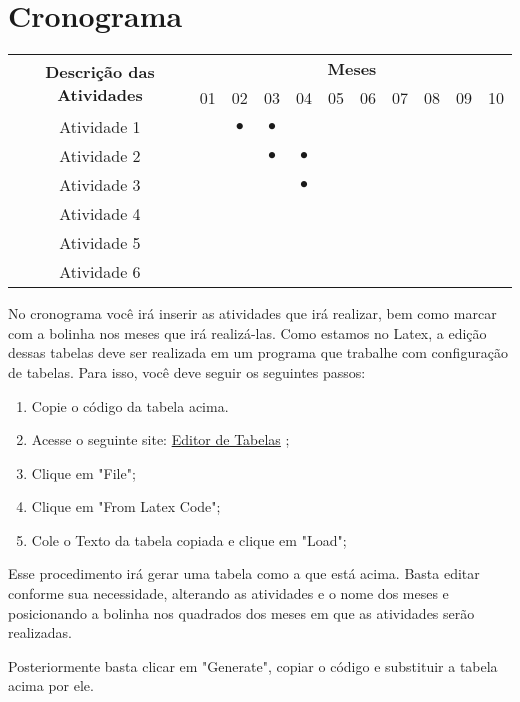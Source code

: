 \chapter{Cronograma}  \label{cap:07}


\begin{table}[!h]
\begin{tabular}{|c|c|c|c|c|c|c|c|c|c|c|}
\hline
\multirow{2}{*}{\textbf{Descrição das Atividades}} & \multicolumn{10}{c|}{\textbf{Meses}}            \\ \cline{2-11} 
                                                   & 01 & 02 & 03 & 04 & 05 & 06 & 07 & 08 & 09 & 10 \\ \hline
Atividade 1                                        &    & $\bullet$ & $\bullet$  &    &    &    &    &    &    &    \\ \hline
Atividade 2                                        &    &    & $\bullet$  & $\bullet$  &    &    &    &    &    &    \\ \hline
Atividade 3                                        &    &    &    & $\bullet$  &    &    &    &    &    &    \\ \hline
Atividade 4                                        &    &    &    &    &    &    &    &    &    &    \\ \hline
Atividade 5                                        &    &    &    &    &    &    &    &    &    &    \\ \hline
Atividade 6                                        &    &    &    &    &    &    &    &    &    &    \\ \hline
\end{tabular}
\end{table}


No cronograma você irá inserir as atividades que irá realizar, bem como marcar com a bolinha nos meses que irá realizá-las. Como estamos no Latex, a edição dessas tabelas deve ser realizada em um programa que trabalhe com configuração de tabelas.
Para isso, você deve seguir os seguintes passos:

\begin{enumerate}
    \item Copie o código da tabela acima.
    \item Acesse o seguinte site: \href{https://www.tablesgenerator.com/latex_tables#}{Editor de Tabelas} ;
    \item Clique em "File";
    \item Clique em "From Latex Code";
    \item Cole o Texto da tabela copiada e clique em "Load";
\end{enumerate}

Esse procedimento irá gerar uma tabela como a que está acima. Basta editar conforme sua necessidade, alterando as atividades e o nome dos meses e posicionando a bolinha nos quadrados dos meses em que as atividades serão realizadas.

Posteriormente basta clicar em "Generate", copiar o código e substituir a tabela acima por ele.